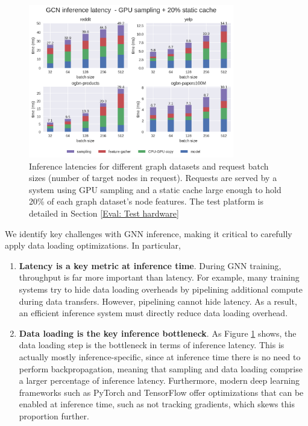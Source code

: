 \begin{figure}[h!]
    \centering
    \includegraphics[width=0.8\textwidth]{figures/GCN_latency_breakdown_gpu_sampled_with_cache.png}
    
    \caption{Inference latencies for different graph datasets and request batch sizes (number of target nodes in request). Requests are served by a system using GPU sampling and a static cache large enough to hold 20\% of each graph dataset's node features. The test platform is detailed in Section \ref{Eval: Test hardware}}
    \label{GPU Sampling Latency Breakdown}
\end{figure}    

We identify key challenges with GNN inference, making it critical to carefully apply data loading optimizations. In particular,

\begin{enumerate}
    \item \textbf{Latency is a key metric at inference time}. During GNN training, throughput is far more important than latency. For example, many training systems try to hide data loading overheads by pipelining additional compute during data transfers. However, pipelining cannot hide latency. As a result, an efficient inference system must directly reduce data loading overhead.
    \item \textbf{Data loading is the key inference bottleneck}. As Figure \ref{GPU Sampling Latency Breakdown} shows, the data loading step is the bottleneck in terms of inference latency. This is actually mostly inference-specific, since at inference time there is no need to perform backpropagation, meaning that sampling and data loading comprise a larger percentage of inference latency. Furthermore, modern deep learning frameworks such as PyTorch \cite{PyTorch_2019} and TensorFlow \cite{tensorflow2015-whitepaper} offer optimizations that can be enabled at inference time, such as not tracking gradients, which skews this proportion further.
\end{enumerate}

